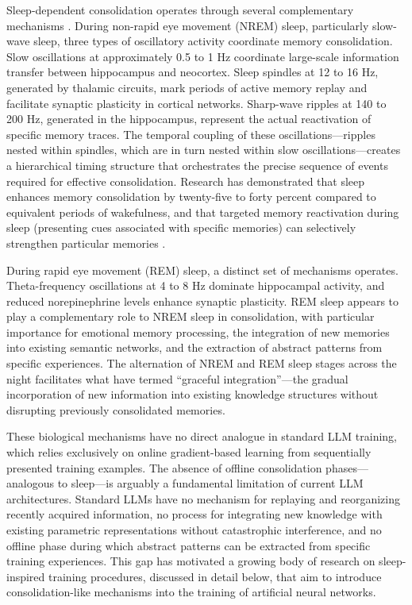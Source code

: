 Sleep-dependent consolidation operates through several complementary mechanisms \citep{diekelmann2010memory}. During non-rapid eye movement (NREM) sleep, particularly slow-wave sleep, three types of oscillatory activity coordinate memory consolidation. Slow oscillations at approximately 0.5 to 1 Hz coordinate large-scale information transfer between hippocampus and neocortex. Sleep spindles at 12 to 16 Hz, generated by thalamic circuits, mark periods of active memory replay and facilitate synaptic plasticity in cortical networks. Sharp-wave ripples at 140 to 200 Hz, generated in the hippocampus, represent the actual reactivation of specific memory traces. The temporal coupling of these oscillations---ripples nested within spindles, which are in turn nested within slow oscillations---creates a hierarchical timing structure that orchestrates the precise sequence of events required for effective consolidation. Research has demonstrated that sleep enhances memory consolidation by twenty-five to forty percent compared to equivalent periods of wakefulness, and that targeted memory reactivation during sleep (presenting cues associated with specific memories) can selectively strengthen particular memories \citep{rasch2013sleep}.

During rapid eye movement (REM) sleep, a distinct set of mechanisms operates. Theta-frequency oscillations at 4 to 8 Hz dominate hippocampal activity, and reduced norepinephrine levels enhance synaptic plasticity. REM sleep appears to play a complementary role to NREM sleep in consolidation, with particular importance for emotional memory processing, the integration of new memories into existing semantic networks, and the extraction of abstract patterns from specific experiences. The alternation of NREM and REM sleep stages across the night facilitates what \citet{gonzalez2022model} have termed ``graceful integration''---the gradual incorporation of new information into existing knowledge structures without disrupting previously consolidated memories.

These biological mechanisms have no direct analogue in standard LLM training, which relies exclusively on online gradient-based learning from sequentially presented training examples. The absence of offline consolidation phases---analogous to sleep---is arguably a fundamental limitation of current LLM architectures. Standard LLMs have no mechanism for replaying and reorganizing recently acquired information, no process for integrating new knowledge with existing parametric representations without catastrophic interference, and no offline phase during which abstract patterns can be extracted from specific training experiences. This gap has motivated a growing body of research on sleep-inspired training procedures, discussed in detail below, that aim to introduce consolidation-like mechanisms into the training of artificial neural networks.

